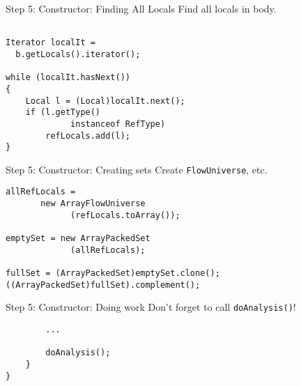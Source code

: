 \begin{slide}{Step 5: Constructor: Finding All Locals}
\vspace*{-0.1in}
Find all locals in body.

\vspace*{-0.1in}
\begin{verbatim}

Iterator localIt = 
  b.getLocals().iterator();

while (localIt.hasNext())
{
    Local l = (Local)localIt.next();
    if (l.getType() 
             instanceof RefType)
        refLocals.add(l);
}
\end{verbatim}
\end{slide}

\begin{slide}{Step 5: Constructor: Creating sets}
\vspace*{-0.1in}
Create {\tt FlowUniverse}, etc.

\vspace*{0.05in}
\begin{verbatim}
allRefLocals = 
       new ArrayFlowUniverse
             (refLocals.toArray());

emptySet = new ArrayPackedSet
             (allRefLocals);

fullSet = (ArrayPackedSet)emptySet.clone();
((ArrayPackedSet)fullSet).complement();
\end{verbatim}
\end{slide}

\begin{slide}{Step 5: Constructor: Doing work}
\vspace*{-0.1in}
Don't forget to call {\tt doAnalysis()}!

\vspace*{0.05in}
\begin{verbatim}
        ...

        doAnalysis();
    }
}
\end{verbatim}
\end{slide}


